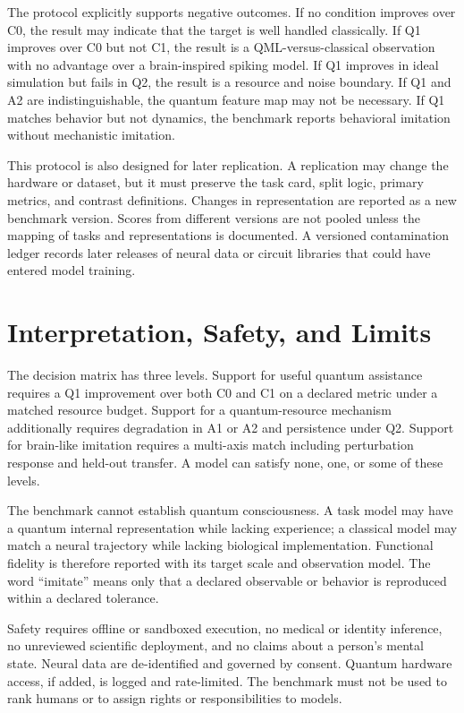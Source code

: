 \documentclass[conference]{IEEEtran}
\begin{document}
The protocol explicitly supports negative outcomes. If no condition improves over C0,
the result may indicate that the target is well handled classically. If Q1 improves over
C0 but not C1, the result is a QML-versus-classical observation with no advantage over a
brain-inspired spiking model. If Q1 improves in ideal simulation but fails in Q2, the
result is a resource and noise boundary. If Q1 and A2 are indistinguishable, the
quantum feature map may not be necessary. If Q1 matches behavior but not dynamics, the
benchmark reports behavioral imitation without mechanistic imitation.

This protocol is also designed for later replication. A replication may change the
hardware or dataset, but it must preserve the task card, split logic, primary metrics,
and contrast definitions. Changes in representation are reported as a new benchmark
version. Scores from different versions are not pooled unless the mapping of tasks and
representations is documented. A versioned contamination ledger records later releases
of neural data or circuit libraries that could have entered model training.

\section{Interpretation, Safety, and Limits}
\label{sec:limits}

The decision matrix has three levels. Support for useful quantum assistance requires a
Q1 improvement over both C0 and C1 on a declared metric under a matched resource budget.
Support for a quantum-resource mechanism additionally requires degradation in A1 or A2
and persistence under Q2. Support for brain-like imitation requires a multi-axis match
including perturbation response and held-out transfer. A model can satisfy none, one, or
some of these levels.

The benchmark cannot establish quantum consciousness. A task model may have a quantum
internal representation while lacking experience; a classical model may match a neural
trajectory while lacking biological implementation. Functional fidelity is therefore
reported with its target scale and observation model. The word ``imitate'' means only
that a declared observable or behavior is reproduced within a declared tolerance.

Safety requires offline or sandboxed execution, no medical or identity inference, no
unreviewed scientific deployment, and no claims about a person's mental state. Neural
data are de-identified and governed by consent. Quantum hardware access, if added, is
logged and rate-limited. The benchmark must not be used to rank humans or to assign
rights or responsibilities to models.
\end{document}
